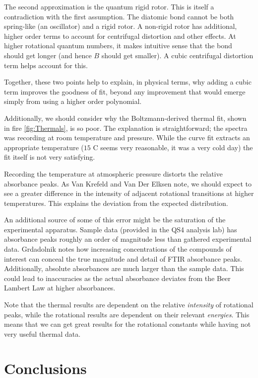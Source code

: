 \documentclass[aps,prl,reprint,10pt,amsmath,amssymb,superscriptaddress,a4paper]{revtex4-2}
\begin{document}
The second approximation is the quantum rigid rotor. This is itself a contradiction with the first assumption. The diatomic bond cannot be both spring-like (an oscillator) and a rigid rotor. A non-rigid rotor has additional, higher order terms to account for centrifugal distortion and other effects. At higher rotational quantum numbers, it makes intuitive sense that the bond should get longer (and hence $B$ should get smaller). A cubic centrifugal distortion term helps account for this.

Together, these two points help to explain, in physical terms, why adding a cubic term improves the goodness of fit, beyond any improvement that would emerge simply from using a higher order polynomial.

Additionally, we should consider why the Boltzmann-derived thermal fit, shown in fire \ref{fig:Thermals}, is so poor. The explanation is straightforward; the spectra was recording at room temperature and pressure. While the curve fit extracts an appropriate temperature ($15$ C seems very reasonable, it was a very cold day) the fit itself is not very satisfying. 

Recording the temperature at atmospheric pressure distorts the relative absorbance peaks. As Van Krefeld and Van Der Elksen note\cite{Pressure}, we should expect to see a greater difference in the intensity of adjacent rotational transitions at higher temperatures. This explains the deviation from the expected distribution.

An additional source of some of this error might be the saturation of the experimental apparatus. Sample data (provided in the QS4 analysis lab) has absorbance peaks roughly an order of magnitude less than gathered experimental data. Grdadolnik notes how increasing concentrations of the compounds of interest can conceal the true magnitude and detail of FTIR absorbance peaks\cite{Saturation}. Additionally, absolute absorbances are much larger than the sample data. This could lead to inaccuracies as the actual absorbance deviates from the Beer Lambert Law at higher absorbances.

Note that the thermal results are dependent on the relative {\it intensity} of rotational peaks, while the rotational results are dependent on their relevant {\it energies}. This means that we can get great results for the rotational constants while having not very useful thermal data.

\section{Conclusions}
\end{document}
